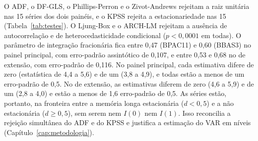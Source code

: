 O ADF, o DF-GLS, o Phillips-Perron e o Zivot-Andrews rejeitam a raiz unitária
nas 15 séries dos dois painéis, e o KPSS rejeita a estacionariedade nas 15
(Tabela~\ref{tab:testes}). O Ljung-Box e o ARCH-LM rejeitam a ausência de
autocorrelação e de heterocedasticidade condicional ($p<0{,}0001$ em todas).
O parâmetro de integração fracionária fica entre 0,47 (BPAC11) e 0,60 (BBAS3)
no painel principal, com erro-padrão assintótico de 0,107, e entre 0,53 e 0,68
no de extensão, com erro-padrão de 0,116. No painel principal, cada estimativa
difere de zero (estatística de 4,4 a 5,6) e de um (3,8 a 4,9), e todas estão a
menos de um erro-padrão de 0,5. No de extensão, as estimativas diferem de zero
(4,6 a 5,9) e de um (2,8 a 4,0) e estão a menos de 1,6 erro-padrão de 0,5. As
séries estão, portanto, na fronteira entre a memória longa estacionária
($d<0{,}5$) e a não estacionária ($d\geq0{,}5$), sem serem nem $I(0)$ nem
$I(1)$. Isso reconcilia a rejeição simultânea do ADF e do KPSS e justifica a
estimação do VAR em níveis (Capítulo~\ref{cap:metodologia}).

